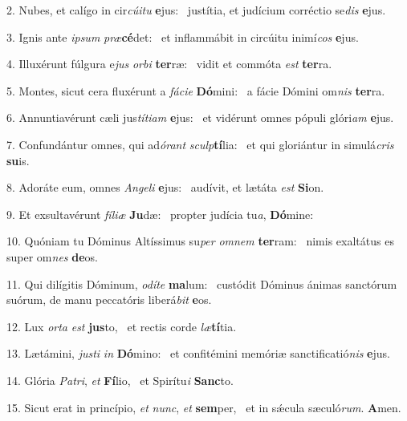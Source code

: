 2. Nubes, et calígo in cir\textit{cú}\textit{i}\textit{tu} \textbf{e}jus: \ast\  justítia, et judícium corréctio se\textit{dis} \textbf{e}jus.\

3. Ignis ante \textit{ip}\textit{sum} \textit{præ}\textbf{cé}det: \ast\  et inflammábit in circúitu inimí\textit{cos} \textbf{e}jus.\

4. Illuxérunt fúlgura e\textit{jus} \textit{or}\textit{bi} \textbf{ter}ræ: \ast\  vidit et commóta \textit{est} \textbf{ter}ra.\

5. Montes, sicut cera fluxérunt a \textit{fá}\textit{ci}\textit{e} \textbf{Dó}mini: \ast\  a fácie Dómini om\textit{nis} \textbf{ter}ra.\

6. Annuntiavérunt cæli jus\textit{tí}\textit{ti}\textit{am} \textbf{e}jus: \ast\  et vidérunt omnes pópuli glóri\textit{am} \textbf{e}jus.\

7. Confundántur omnes, qui ad\textit{ó}\textit{rant} \textit{sculp}\textbf{tí}lia: \ast\  et qui gloriántur in simulá\textit{cris} \textbf{su}is.\

8. Adoráte eum, omnes \textit{An}\textit{ge}\textit{li} \textbf{e}jus: \ast\  audívit, et lætáta \textit{est} \textbf{Si}on.\

9. Et exsultavérunt \textit{fí}\textit{li}\textit{æ} \textbf{Ju}dæ: \ast\  propter judícia tu\textit{a}, \textbf{Dó}mine:\

10. Quóniam tu Dóminus Altíssimus su\textit{per} \textit{om}\textit{nem} \textbf{ter}ram: \ast\  nimis exaltátus es super om\textit{nes} \textbf{de}os.\

11. Qui dilígitis Dóminum, \textit{o}\textit{dí}\textit{te} \textbf{ma}lum: \ast\  custódit Dóminus ánimas sanctórum suórum, de manu peccatóris liberá\textit{bit} \textbf{e}os.\

12. Lux \textit{or}\textit{ta} \textit{est} \textbf{jus}to, \ast\  et rectis corde \textit{læ}\textbf{tí}tia.\

13. Lætámini, \textit{jus}\textit{ti} \textit{in} \textbf{Dó}mino: \ast\  et confitémini memóriæ sanctificatió\textit{nis} \textbf{e}jus.\

14. Glória \textit{Pa}\textit{tri}, \textit{et} \textbf{Fí}lio, \ast\  et Spirítu\textit{i} \textbf{Sanc}to.\

15. Sicut erat in princípio, \textit{et} \textit{nunc}, \textit{et} \textbf{sem}per, \ast\  et in sǽcula sæculó\textit{rum}. \textbf{A}men.\

